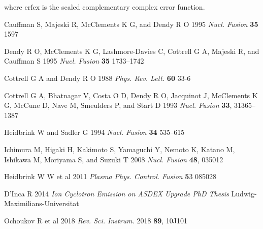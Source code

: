 \documentclass[12pt]{iopart}
\begin{document}
\noindent where $\mathrm{erfcx}$ is the scaled complementary complex error function.

\newpage




\begin{thebibliography}{9}

Cauffman S, Majeski R, McClements K G, and Dendy R O 1995 \textit{Nucl. Fusion} \textbf{35} 1597

Dendy R O, McClements K G, Lashmore-Davies C, Cottrell G A, Majeski R, and Cauffman S 1995 \textit{Nucl. Fusion} \textbf{35} 1733–1742

Cottrell G A and Dendy R O 1988 \textit{Phys. Rev. Lett.} \textbf{60} 33-6

Cottrell G A, Bhatnagar V, Costa O D, Dendy R O, Jacquinot J, McClements K G, McCune D, Nave M, Smeulders P, and Start D 1993 \textit{Nucl. Fusion} \textbf{33}, 31365–1387
% 

Heidbrink W and Sadler G 1994 \textit{Nucl. Fusion} \textbf{34} 535–615

Ichimura M, Higaki H, Kakimoto S, Yamaguchi Y, Nemoto K, Katano M, Ishikawa M, Moriyama S, and Suzuki T 2008 \textit{Nucl. Fusion} \textbf{48}, 035012

Heidbrink W W et al 2011 \textit{Plasma Phys. Control. Fusion} {\textbf 53} 085028

D’Inca R 2014 \textit{Ion Cyclotron Emission on ASDEX Upgrade PhD Thesis} Ludwig-Maximilians-Universitat

Ochoukov R et al 2018 \textit{Rev. Sci. Instrum.} 2018 \textbf{89}, 10J101


\end{thebibliography}
\end{document}
